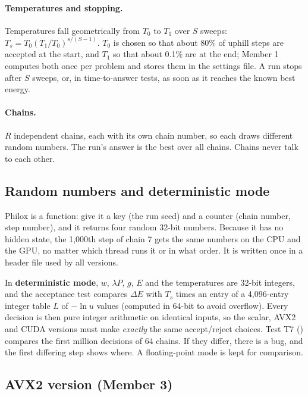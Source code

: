 \paragraph{Temperatures and stopping.} Temperatures fall geometrically from $T_0$ to $T_1$ over $S$ sweeps: $T_s=T_0(T_1/T_0)^{s/(S-1)}$. $T_0$ is chosen so that about 80\% of uphill steps are accepted at the start, and $T_1$ so that about 0.1\% are at the end; Member 1 computes both once per problem and stores them in the settings file. A run stops after $S$ sweeps, or, in time-to-answer tests, as soon as it reaches the known best energy.

\paragraph{Chains.} $R$ independent chains, each with its own chain number, so each draws different random numbers. The run's answer is the best over all chains. Chains never talk to each other.

\subsection{Random numbers and deterministic mode}

Philox \cite{salmon2011parallel} is a function: give it a key (the run seed) and a counter (chain number, step number), and it returns four random 32-bit numbers. Because it has no hidden state, the 1{,}000th step of chain 7 gets the same numbers on the CPU and the GPU, no matter which thread runs it or in what order. It is written once in a header file used by all versions.

In \textbf{deterministic mode}, $w$, $\lambda P$, $g$, $E$ and the temperatures are 32-bit integers, and the acceptance test compares $\Delta E$ with $T_s$ times an entry of a 4{,}096-entry integer table $L$ of $-\ln u$ values (computed in 64-bit to avoid overflow). Every decision is then pure integer arithmetic on identical inputs, so the scalar, AVX2 and CUDA versions must make \emph{exactly} the same accept/reject choices. Test T7 () compares the first million decisions of 64 chains. If they differ, there is a bug, and the first differing step shows where. A floating-point mode is kept for comparison.

\subsection{AVX2 version (Member 3)}

